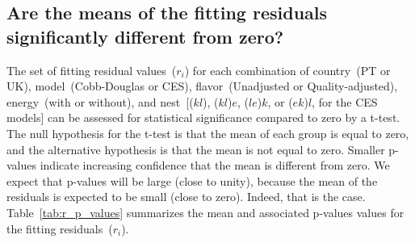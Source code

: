\documentclass[preprint,authoryear,12pt]{elsarticle}\usepackage[]{graphicx}\usepackage[]{color}
\begin{document}
\subsection{Are the means of the fitting residuals 
            significantly different from zero?} 
\label{sec:fitting_residuals_different_from_zero}

The set of fitting residual values~($r_i$)
for each combination of 
country~(PT or UK), 
model~(Cobb-Douglas or CES),
flavor~(Unadjusted or Quality-adjusted), 
energy~(with or without), and
nest~[($kl$), ($kl$)$e$, ($le$)$k$, or ($ek$)$l$, for the CES models]
can be assessed for statistical significance
compared to zero by a t-test.
The null hypothesis for the t-test is that the mean of each group is
equal to zero, and 
the alternative hypothesis is that the mean is not equal to zero.
Smaller p-values indicate increasing confidence that the 
mean is different from zero. 
We expect that p-values will be large (close to unity), 
because the mean of the residuals is expected to be small (close to zero).
Indeed, that is the case.
Table~\ref{tab:r_p_values} summarizes the mean 
and associated p-values values for the fitting residuals~($r_i$).
%
\end{document}
